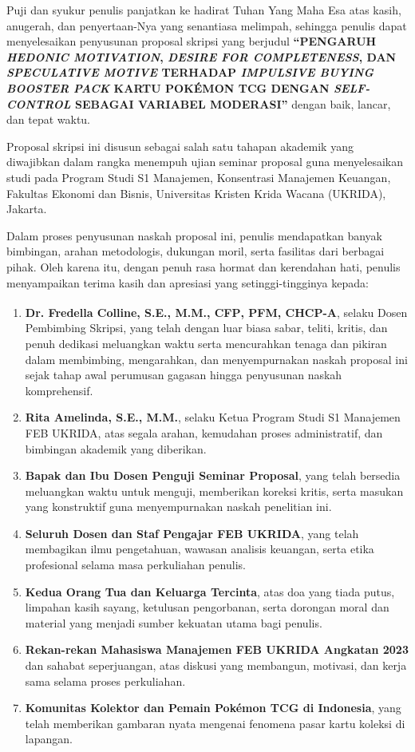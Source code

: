 \documentclass[12pt,a4paper]{article}
\numberwithin{equation}{section}
\numberwithin{table}{section}
\numberwithin{figure}{section}
\newcommand{\dosbim}{Dr. Fredella Colline, S.E., M.M., CFP\textsuperscript{\textregistered}, PFM, CHCP-A}
\newcommand{\ketprodi}{Rita Amelinda, S.E., M.M.}
\newcommand{\judulskripsi}{PENGARUH \emph{HEDONIC MOTIVATION}, \emph{DESIRE FOR COMPLETENESS}, DAN \emph{SPECULATIVE MOTIVE} TERHADAP \emph{IMPULSIVE BUYING} \emph{BOOSTER PACK} KARTU POK\'EMON TCG DENGAN \emph{SELF-CONTROL} SEBAGAI VARIABEL MODERASI}
\begin{document}
\vspace{0.4cm}
Puji dan syukur penulis panjatkan ke hadirat Tuhan Yang Maha Esa atas kasih, anugerah, dan penyertaan-Nya yang senantiasa melimpah, sehingga penulis dapat menyelesaikan penyusunan proposal skripsi yang berjudul \textbf{``\judulskripsi''} dengan baik, lancar, dan tepat waktu.

Proposal skripsi ini disusun sebagai salah satu tahapan akademik yang diwajibkan dalam rangka menempuh ujian seminar proposal guna menyelesaikan studi pada Program Studi S1 Manajemen, Konsentrasi Manajemen Keuangan, Fakultas Ekonomi dan Bisnis, Universitas Kristen Krida Wacana (UKRIDA), Jakarta.

Dalam proses penyusunan naskah proposal ini, penulis mendapatkan banyak bimbingan, arahan metodologis, dukungan moril, serta fasilitas dari berbagai pihak. Oleh karena itu, dengan penuh rasa hormat dan kerendahan hati, penulis menyampaikan terima kasih dan apresiasi yang setinggi-tingginya kepada:

\begin{enumerate}
  \item \textbf{\dosbim}, selaku Dosen Pembimbing Skripsi, yang telah dengan luar biasa sabar, teliti, kritis, dan penuh dedikasi meluangkan waktu serta mencurahkan tenaga dan pikiran dalam membimbing, mengarahkan, dan menyempurnakan naskah proposal ini sejak tahap awal perumusan gagasan hingga penyusunan naskah komprehensif.
  \item \textbf{\ketprodi}, selaku Ketua Program Studi S1 Manajemen FEB UKRIDA, atas segala arahan, kemudahan proses administratif, dan bimbingan akademik yang diberikan.
  \item \textbf{Bapak dan Ibu Dosen Penguji Seminar Proposal}, yang telah bersedia meluangkan waktu untuk menguji, memberikan koreksi kritis, serta masukan yang konstruktif guna menyempurnakan naskah penelitian ini.
  \item \textbf{Seluruh Dosen dan Staf Pengajar FEB UKRIDA}, yang telah membagikan ilmu pengetahuan, wawasan analisis keuangan, serta etika profesional selama masa perkuliahan penulis.
  \item \textbf{Kedua Orang Tua dan Keluarga Tercinta}, atas doa yang tiada putus, limpahan kasih sayang, ketulusan pengorbanan, serta dorongan moral dan material yang menjadi sumber kekuatan utama bagi penulis.
  \item \textbf{Rekan-rekan Mahasiswa Manajemen FEB UKRIDA Angkatan 2023} dan sahabat seperjuangan, atas diskusi yang membangun, motivasi, dan kerja sama selama proses perkuliahan.
  \item \textbf{Komunitas Kolektor dan Pemain Pok\'emon TCG di Indonesia}, yang telah memberikan gambaran nyata mengenai fenomena pasar kartu koleksi di lapangan.
\end{enumerate}
\end{document}

